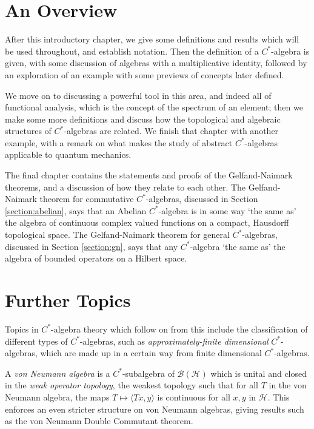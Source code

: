 \documentclass[11pt,a4paper]{report}
\theoremstyle{plain}
\theoremstyle{definition}
\newcommand{\1}{\mathbbm{1}}
\renewcommand{\H}{\mathcal{H}}
\newcommand{\B}{\mathcal{B}}
\newcommand{\BH}{\mathcal{\B(\H)}}
\begin{document}
\section{An Overview}

After this introductory chapter, we give some definitions and results which will 
be used throughout, and establish notation. Then the definition of a 
$C^\ast$-algebra is given, with some discussion of algebras with a 
multiplicative identity, followed by an exploration of an example with some 
previews of concepts later defined. 

We move on to discussing a powerful tool in 
this area, and indeed all of functional analysis, which is the concept of the 
spectrum of an element; then we make some more definitions and discuss how the 
topological and algebraic structures of $C^\ast$-algebras are related. 
We finish that chapter with another example, with a remark on what makes the 
study of abstract $C^\ast$-algebras applicable to quantum mechanics. 

The final chapter contains the statements and proofs of the Gelfand-Naimark 
theorems, and a discussion of how they relate to each other. The Gelfand-Naimark 
theorem for commutative $C^\ast$-algebras, discussed in Section 
\ref{section:abelian}, says that an Abelian $C^\ast$-algebra is in some way `the 
same as' the algebra of continuous complex valued functions on a compact, 
Hausdorff topological space. The Gelfand-Naimark theorem for general 
$C^\ast$-algebras, discussed in Section \ref{section:gn}, says that any 
$C^\ast$-algebra `the same as' the algebra of bounded operators on a Hilbert 
space.





\section{Further Topics}
Topics in $C^\ast$-algebra theory which follow on from this include the 
classification of different types of $C^\ast$-algebras, such as 
\emph{approximately-finite dimensional} $C^\ast$-algebras, which are made up in 
a certain way from finite dimensional $C^\ast$-algebras.


A \emph{von Neumann algebra }is a $C^\ast$-subalgebra of $\BH$ which is unital 
and closed in the \emph{weak operator topology}, the weakest topology such that
for all $T$ in the von Neumann algebra, the maps $T\mapsto\langle Tx,y\rangle$ 
is continuous for all $x,y$ in $\H$. This enforces an even stricter structure 
on von Neumann algebras, giving results such as the von Neumann Double 
Commutant theorem.
\end{document}
